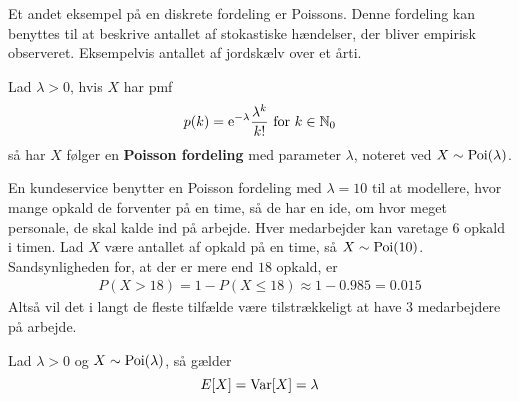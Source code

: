 Et andet eksempel på en diskrete fordeling er Poissons. Denne fordeling kan benyttes til at beskrive antallet af stokastiske hændelser, der bliver empirisk observeret. Eksempelvis antallet af jordskælv over et årti.
\begin{defn}\label{def:poisson}
    Lad $\lambda>0$, hvis $X$ har pmf
    \begin{align*}
         p(k)=\mathrm{e}^{-\lambda}\frac{\lambda^k}{k!}\text{ for } k\in\mathbb{N}_0
    \end{align*}
    så har $X$ følger en \textbf{Poisson fordeling} med parameter $\lambda$, noteret ved $X\sim\textnormal{Poi}(\lambda)$.
\end{defn}

\begin{exmp}\label{exmp:kundeservice}
En kundeservice benytter en Poisson fordeling med $\lambda = 10$ til at modellere, hvor mange opkald de forventer på en time, så de har en ide, om hvor meget personale, de skal kalde ind på arbejde. Hver medarbejder kan varetage $6$ opkald i timen. Lad $X$ være antallet af opkald på en time, så $X \sim \textnormal{Poi}(10)$.
Sandsynligheden for, at der er mere end $18$ opkald, er
\begin{align*}
    P(X > 18) = 1 - P(X \leq 18) \approx 1 - 0.985 = 0.015
\end{align*}
Altså vil det i langt de fleste tilfælde være tilstrækkeligt at have 3 medarbejdere på arbejde. 
\end{exmp}
\begin{prop}\label{prop:poiForventedOgVarians} %
Lad $\lambda > 0$ og $X \sim \textnormal{Poi}(\lambda)$, så gælder
\begin{equation*}
    E[X] = \textnormal{Var}[X] = \lambda
\end{equation*}
\end{prop}
